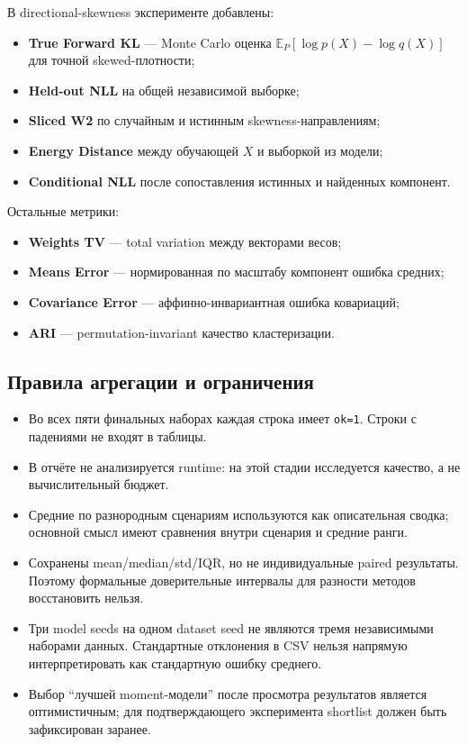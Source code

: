 \documentclass[11pt,a4paper]{article}
\newcommand{\code}[1]{{\footnotesize\nolinkurl{#1}}}
\begin{document}
В directional-skewness эксперименте добавлены:

\begin{itemize}
  \item \textbf{True Forward KL} --- Monte Carlo оценка
    $\mathbb E_P[\log p(X)-\log q(X)]$ для точной skewed-плотности;
  \item \textbf{Held-out NLL} на общей независимой выборке;
  \item \textbf{Sliced W2} по случайным и истинным skewness-направлениям;
  \item \textbf{Energy Distance} между обучающей $X$ и выборкой из модели;
  \item \textbf{Conditional NLL} после сопоставления истинных и найденных
    компонент.
\end{itemize}

Остальные метрики:

\begin{itemize}
  \item \textbf{Weights TV} --- total variation между векторами весов;
  \item \textbf{Means Error} --- нормированная по масштабу компонент ошибка
    средних;
  \item \textbf{Covariance Error} --- аффинно-инвариантная ошибка ковариаций;
  \item \textbf{ARI} --- permutation-invariant качество кластеризации.
\end{itemize}

\subsection{Правила агрегации и ограничения}

\begin{itemize}
  \item Во всех пяти финальных наборах каждая строка имеет \code{ok=1}.
        Строки с падениями не входят в таблицы.
  \item В отчёте не анализируется runtime: на этой стадии исследуется качество,
        а не вычислительный бюджет.
  \item Средние по разнородным сценариям используются как описательная сводка;
        основной смысл имеют сравнения внутри сценария и средние ранги.
  \item Сохранены mean/median/std/IQR, но не индивидуальные paired результаты.
        Поэтому формальные доверительные интервалы для разности методов
        восстановить нельзя.
  \item Три model seeds на одном dataset seed не являются тремя независимыми
        наборами данных. Стандартные отклонения в CSV нельзя напрямую
        интерпретировать как стандартную ошибку среднего.
  \item Выбор ``лучшей moment-модели'' после просмотра результатов является
        оптимистичным; для подтверждающего эксперимента shortlist должен быть
        зафиксирован заранее.
\end{itemize}
\end{document}
